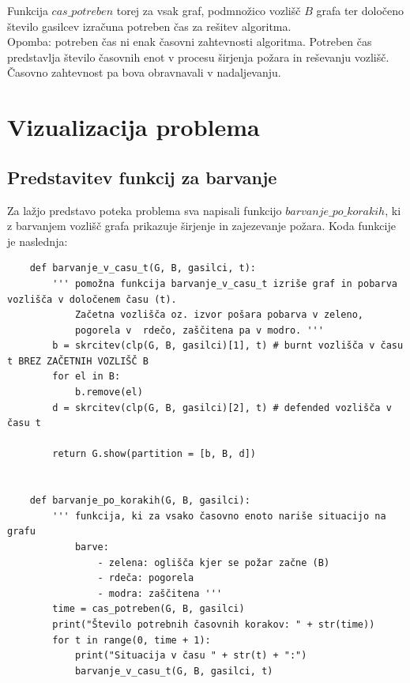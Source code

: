 \documentclass[a4paper, 12pt]{article}
\begin{document}
\noindent Funkcija $cas\_potreben$ torej za vsak graf, podmnožico vozlišč $B$ grafa ter določeno število gasilcev
izračuna potreben čas za rešitev algoritma. \\
Opomba: potreben čas ni enak časovni zahtevnosti
algoritma. Potreben čas predstavlja število časovnih enot v procesu širjenja požara in reševanju vozlišč.
Časovno zahtevnost pa bova obravnavali v nadaljevanju. 

\pagebreak


\section{Vizualizacija problema}

\subsection{Predstavitev funkcij za barvanje}

\noindent Za lažjo predstavo poteka problema sva napisali funkcijo $barvanje\_po\_korakih$, ki z barvanjem
vozlišč grafa prikazuje širjenje in zajezevanje požara. Koda funkcije je naslednja:

\begin{scriptsize}
\begin{verbatim}
    def barvanje_v_casu_t(G, B, gasilci, t):
        ''' pomožna funkcija barvanje_v_casu_t izriše graf in pobarva vozlišča v določenem času (t). 
            Začetna vozlišča oz. izvor pošara pobarva v zeleno, 
            pogorela v  rdečo, zaščitena pa v modro. '''
        b = skrcitev(clp(G, B, gasilci)[1], t) # burnt vozlišča v času t BREZ ZAČETNIH VOZLIŠČ B
        for el in B:
            b.remove(el)
        d = skrcitev(clp(G, B, gasilci)[2], t) # defended vozlišča v času t
        
        return G.show(partition = [b, B, d])


    def barvanje_po_korakih(G, B, gasilci):
        ''' funkcija, ki za vsako časovno enoto nariše situacijo na grafu
            barve:
                - zelena: oglišča kjer se požar začne (B)
                - rdeča: pogorela
                - modra: zaščitena '''
        time = cas_potreben(G, B, gasilci)
        print("Število potrebnih časovnih korakov: " + str(time))
        for t in range(0, time + 1):
            print("Situacija v času " + str(t) + ":")
            barvanje_v_casu_t(G, B, gasilci, t)\end{verbatim}
\end{scriptsize}
\end{document}
